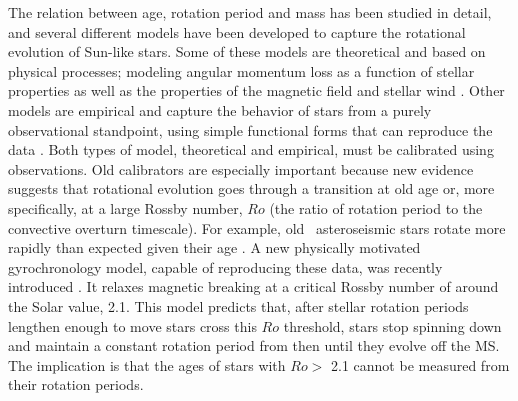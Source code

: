The relation between age, rotation period and mass has been studied in detail,
and several different models have been developed to capture the rotational
evolution of Sun-like stars.
Some of these models are theoretical and based on physical processes; modeling
angular momentum loss as a function of stellar properties as well as the
properties of the magnetic field and stellar wind \citep{kawaler1988,
kawaler1989, vansaders2013, matt2015, vansaders2016}.
Other models are empirical and capture the behavior of stars from a purely
observational standpoint, using simple functional forms that can reproduce the
data \citep{barnes2003, barnes2007, mamajek2008, angus2015}.
Both types of model, theoretical and empirical, must be calibrated using
observations.
Old calibrators are especially important because new evidence suggests that
rotational evolution goes through a transition at old age or, more
specifically, at a large Rossby number, $Ro$ (the ratio of rotation period to
the convective overturn timescale).
For example, old \kepler\ asteroseismic stars rotate more rapidly than
expected given their age \citep[\eg][]{angus2015, vansaders2016}.
A new physically motivated gyrochronology model, capable of reproducing these
data, was recently introduced \citep{vansaders2016}.
It relaxes magnetic breaking at a critical Rossby number of around the Solar
value, 2.1.
This model predicts that, after stellar rotation periods lengthen enough to
move stars cross this $Ro$ threshold, stars stop spinning down and maintain a
constant rotation period from then until they evolve off the MS.
The implication is that the ages of stars with $Ro >$ 2.1 cannot be measured
from their rotation periods.


